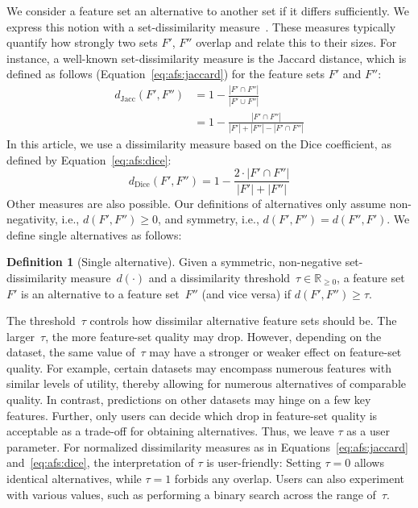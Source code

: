\documentclass[iicol, sn-basic, Numbered]{sn-jnl} %
\theoremstyle{plain}
\theoremstyle{definition}
\newtheorem{definition}{Definition}
\begin{document}
We consider a feature set an alternative to another set if it differs sufficiently.
We express this notion with a set-dissimilarity measure~\cite{choi2010survey, egghe2009new}.
These measures typically quantify how strongly two sets $F'$, $F''$ overlap and relate this to their sizes.
For instance, a well-known set-dissimilarity measure is the Jaccard distance, which is defined as follows (Equation~\ref{eq:afs:jaccard}) for the feature sets $F'$ and $F''$:
%
\begin{equation}
	\begin{aligned}
		d_{\text{Jacc}}(F',F'') & = 1 - \frac{|F' \cap F''|}{|F' \cup F''|} \\
		& = 1 - \frac{|F' \cap F''|}{|F'| + |F''| - |F' \cap F''|}
	\end{aligned}
	\label{eq:afs:jaccard}
\end{equation}
%
In this article, we use a dissimilarity measure based on the Dice coefficient, as defined by Equation~\ref{eq:afs:dice}:
%
\begin{equation}
	d_{\text{Dice}}(F',F'') = 1 - \frac{2 \cdot |F' \cap F''|}{|F'| + |F''|}
	\label{eq:afs:dice}
\end{equation}
%
Other measures are also possible.
Our definitions of alternatives only assume non-negativity, i.e., $d(F',F'') \geq 0$, and symmetry, i.e., $d(F',F'')=d(F'',F')$.
We define single alternatives as follows:
%
\begin{definition}[Single alternative]
	Given a symmetric, non-negative set-dissimilarity measure~$d(\cdot)$ and a dissimilarity threshold~$\tau \in \mathbb{R}_{\geq 0}$, a feature set $F'$ is an alternative to a feature set~$F''$ (and vice versa) if $d(F',F'') \geq \tau$.
	\label{def:afs:single-alternative}
\end{definition}
%
The threshold~$\tau$ controls how dissimilar alternative feature sets should be.
The larger~$\tau$, the more feature-set quality may drop.
However, depending on the dataset, the same value of~$\tau$ may have a stronger or weaker effect on feature-set quality.
For example, certain datasets may encompass numerous features with similar levels of utility, thereby allowing for numerous alternatives of comparable quality. 
In contrast, predictions on other datasets may hinge on a few key features.
Further, only users can decide which drop in feature-set quality is acceptable as a trade-off for obtaining alternatives.
Thus, we leave $\tau$ as a user parameter.
For normalized dissimilarity measures as in Equations~\ref{eq:afs:jaccard} and~\ref{eq:afs:dice}, the interpretation of $\tau$ is user-friendly:
Setting $\tau=0$ allows identical alternatives, while $\tau=1$ forbids any overlap.
Users can also experiment with various values, such as performing a binary search across the range of~$\tau$.
\end{document}
